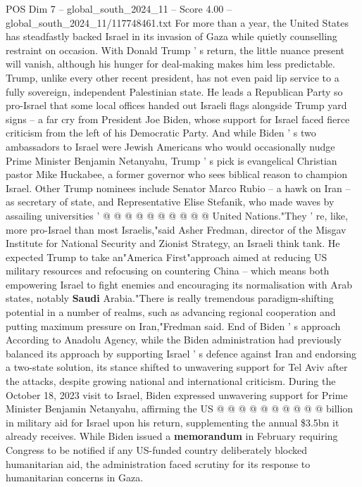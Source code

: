 \begin{textsample}{POS Dim 7 – global\_south\_2024\_11 – Score 4.00 – global\_south\_2024\_11/117748461.txt}  \label{ex:f7_pos_010}
For more than a year, the United States has steadfastly backed Israel in its invasion of Gaza while quietly counselling restraint on occasion.
With Donald Trump ' s return, the little nuance present will vanish, although his hunger for deal-making makes him less predictable.
Trump, unlike every other recent president, has not even paid lip service to a fully sovereign, independent Palestinian state.
He leads a Republican Party so pro-Israel that some local offices handed out Israeli flags alongside Trump yard signs -- a far cry from President Joe Biden, whose support for Israel faced fierce criticism from the left of his Democratic Party.
And while Biden ' s two ambassadors to Israel were Jewish Americans who would occasionally nudge Prime Minister Benjamin Netanyahu, Trump ' s pick is evangelical Christian pastor Mike Huckabee, a former governor who sees biblical reason to champion Israel.
Other Trump nominees include Senator Marco Rubio -- a hawk on Iran -- as secretary of state, and Representative Elise Stefanik, who made waves by assailing universities ' @ @ @ @ @ @ @ @ @ @ United Nations."They ' re, like, more pro-Israel than most Israelis,"said Asher Fredman, director of the Misgav Institute for National Security and Zionist Strategy, an Israeli think tank.
He expected Trump to take an"America First"approach aimed at reducing US military resources and refocusing on countering China -- which means both empowering Israel to fight enemies and encouraging its normalisation with Arab states, notably \textbf{Saudi} Arabia."There is really tremendous paradigm-shifting potential in a number of realms, such as advancing regional cooperation and putting maximum pressure on Iran,"Fredman said.
End of Biden ' s approach According to Anadolu Agency, while the Biden administration had previously balanced its approach by supporting Israel ' s defence against Iran and endorsing a two-state solution, its stance shifted to unwavering support for Tel Aviv after the attacks, despite growing national and international criticism.
During the October 18, 2023 visit to Israel, Biden expressed unwavering support for Prime Minister Benjamin Netanyahu, affirming the US @ @ @ @ @ @ @ @ @ @ billion in military aid for Israel upon his return, supplementing the annual \$3.5bn it already receives.
While Biden issued a \textbf{memorandum} in February requiring Congress to be notified if any US-funded country deliberately blocked humanitarian aid, the administration faced scrutiny for its response to humanitarian concerns in Gaza.

\end{textsample}
